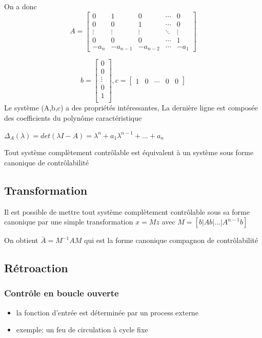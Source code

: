 \documentclass[resume]{subfiles}
\begin{document}
On a donc 
$$
A=\begin{bmatrix}
0 & 1 & 0 & \cdots & 0 \\
0 & 0 & 1 & \cdots & 0 \\
\vdots & \vdots & \vdots& \ddots & \vdots\\
0 & 0 & 0 & \cdots & 1 \\
-a_n & -a_{n-1}& -a_{n-2} &\cdots& -a_{1}
\end{bmatrix}$$

$$b=\begin{bmatrix}
0 \\
0 \\
\vdots\\
0 \\
1 \\
\end{bmatrix},
c=\begin{bmatrix}
1&0&\cdots&0 &0
\end{bmatrix}
$$
Le système (A,b,c) a des propriétés intéressantes, La dernière ligne est composée des coefficients du polynôme caractéristique

$\Delta_A(\lambda) = det (\lambda I - A) = \lambda^n + a_1\lambda^{n-1} +...+ a_n  $ 

Tout système complètement contrôlable est équivalent à un système sous forme canonique de contrôlabilité

\subsection{Transformation}

Il est possible de mettre tout système complètement contrôlable sous sa forme canonique par une simple transformation $x=Mz$ avec $M=[b|Ab|...|A^{n-1}b]$ 

On obtient $\bar{A}= M^{-1}AM$ qui est la forme canonique compagnon de contrôlabilité

\subsection{Rétroaction}

\subsubsection{Contrôle en boucle ouverte}
\begin{itemize}
\item la fonction d'entrée est déterminée par un process
  externe
\item exemple: un feu de circulation à cycle fixe
\end{itemize}
\end{document}
